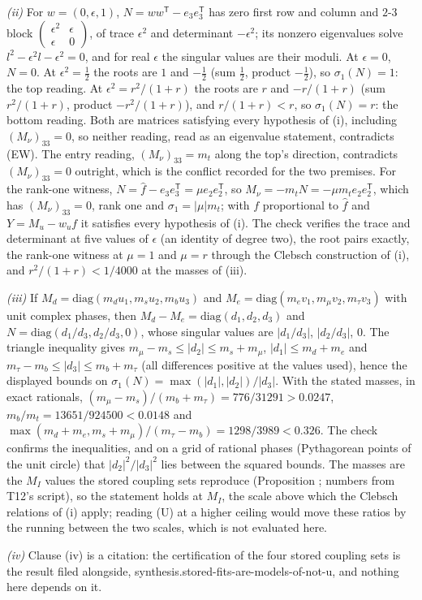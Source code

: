 \emph{(ii)} For $w = (0, \epsilon, 1)$, $N = ww^{\mathsf{T}} - e_{3}e_{3}^{\mathsf{T}}$ has zero first row and column and $2$-$3$ block $\left(\begin{smallmatrix}\epsilon^{2} & \epsilon\\ \epsilon & 0\end{smallmatrix}\right)$, of trace $\epsilon^{2}$ and determinant $-\epsilon^{2}$; its nonzero eigenvalues solve $l^{2} - \epsilon^{2}l - \epsilon^{2} = 0$, and for real $\epsilon$ the singular values are their moduli. At $\epsilon = 0$, $N = 0$. At $\epsilon^{2} = \tfrac12$ the roots are $1$ and $-\tfrac12$ (sum $\tfrac12$, product $-\tfrac12$), so $\sigma_{1}(N) = 1$: the top reading. At $\epsilon^{2} = r^{2}/(1 + r)$ the roots are $r$ and $-r/(1+r)$ (sum $r^{2}/(1+r)$, product $-r^{2}/(1+r)$), and $r/(1+r) < r$, so $\sigma_{1}(N) = r$: the bottom reading. Both are matrices satisfying every hypothesis of (i), including $(M_{\nu})_{33} = 0$, so neither reading, read as an eigenvalue statement, contradicts (EW). The entry reading, $(M_{\nu})_{33} = m_{t}$ along the top's direction, contradicts $(M_{\nu})_{33} = 0$ outright, which is the conflict recorded for the two premises. For the rank-one witness, $N = \hat{f} - e_{3}e_{3}^{\mathsf{T}} = \mu e_{2}e_{2}^{\mathsf{T}}$, so $M_{\nu} = -m_{t}N = -\mu m_{t}e_{2}e_{2}^{\mathsf{T}}$, which has $(M_{\nu})_{33} = 0$, rank one and $\sigma_{1} = |\mu|m_{t}$; with $f$ proportional to $\hat{f}$ and $Y = M_{u} - w_{u}f$ it satisfies every hypothesis of (i). The check verifies the trace and determinant at five values of $\epsilon$ (an identity of degree two), the root pairs exactly, the rank-one witness at $\mu = 1$ and $\mu = r$ through the Clebsch construction of (i), and $r^{2}/(1+r) < 1/4000$ at the masses of (iii).

\emph{(iii)} If $M_{d} = \mathrm{diag}(m_{d}u_{1}, m_{s}u_{2}, m_{b}u_{3})$ and $M_{e} = \mathrm{diag}(m_{e}v_{1}, m_{\mu}v_{2}, m_{\tau}v_{3})$ with unit complex phases, then $M_{d} - M_{e} = \mathrm{diag}(d_{1}, d_{2}, d_{3})$ and $N = \mathrm{diag}(d_{1}/d_{3}, d_{2}/d_{3}, 0)$, whose singular values are $|d_{1}/d_{3}|$, $|d_{2}/d_{3}|$, $0$. The triangle inequality gives $m_{\mu} - m_{s} \le |d_{2}| \le m_{s} + m_{\mu}$, $|d_{1}| \le m_{d} + m_{e}$ and $m_{\tau} - m_{b} \le |d_{3}| \le m_{b} + m_{\tau}$ (all differences positive at the values used), hence the displayed bounds on $\sigma_{1}(N) = \max(|d_{1}|, |d_{2}|)/|d_{3}|$. With the stated masses, in exact rationals, $(m_{\mu} - m_{s})/(m_{b} + m_{\tau}) = 776/31291 > 0.0247$, $m_{b}/m_{t} = 13651/924500 < 0.0148$ and $\max(m_{d} + m_{e}, m_{s} + m_{\mu})/(m_{\tau} - m_{b}) = 1298/3989 < 0.326$. The check confirms the inequalities, and on a grid of rational phases (Pythagorean points of the unit circle) that $|d_{2}|^{2}/|d_{3}|^{2}$ lies between the squared bounds. The masses are the $M_{I}$ values the stored coupling sets reproduce (Proposition ; numbers from T12's script), so the statement holds at $M_{I}$, the scale above which the Clebsch relations of (i) apply; reading (U) at a higher ceiling would move these ratios by the running between the two scales, which is not evaluated here.

\emph{(iv)} Clause (iv) is a citation: the certification of the four stored coupling sets is the result filed alongside, synthesis.stored-fits-are-models-of-not-u, and nothing here depends on it.
